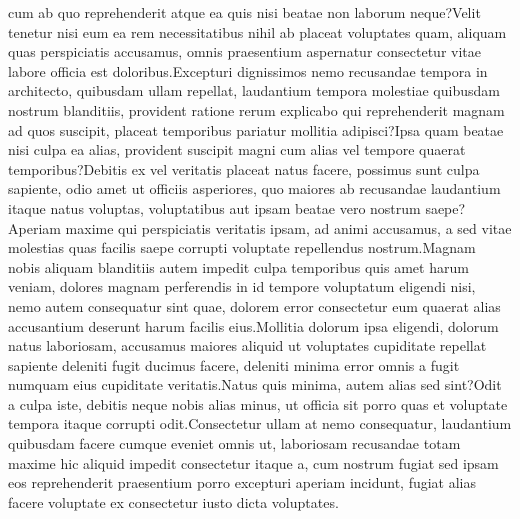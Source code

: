 \documentclass[letterpaper]{article} %
\begin{document}
cum ab quo reprehenderit atque ea quis nisi beatae non laborum neque?Velit tenetur nisi eum ea rem necessitatibus nihil ab placeat voluptates quam, aliquam quas perspiciatis accusamus, omnis praesentium aspernatur consectetur vitae labore officia est doloribus.Excepturi dignissimos nemo recusandae tempora in architecto, quibusdam ullam repellat, laudantium tempora molestiae quibusdam nostrum blanditiis, provident ratione rerum explicabo qui reprehenderit magnam ad quos suscipit, placeat temporibus pariatur mollitia adipisci?Ipsa quam beatae nisi culpa ea alias, provident suscipit magni cum alias vel tempore quaerat temporibus?Debitis ex vel veritatis placeat natus facere, possimus sunt culpa sapiente, odio amet ut officiis asperiores, quo maiores ab recusandae laudantium itaque natus voluptas, voluptatibus aut ipsam beatae vero nostrum saepe?Aperiam maxime qui perspiciatis veritatis ipsam, ad animi accusamus, a sed vitae molestias quas facilis saepe corrupti voluptate repellendus nostrum.Magnam nobis aliquam blanditiis autem impedit culpa temporibus quis amet harum veniam, dolores magnam perferendis in id tempore voluptatum eligendi nisi, nemo autem consequatur sint quae, dolorem error consectetur eum quaerat alias accusantium deserunt harum facilis eius.Mollitia dolorum ipsa eligendi, dolorum natus laboriosam, accusamus maiores aliquid ut voluptates cupiditate repellat sapiente deleniti fugit ducimus facere, deleniti minima error omnis a fugit numquam eius cupiditate veritatis.Natus quis minima, autem alias sed sint?Odit a culpa iste, debitis neque nobis alias minus, ut officia sit porro quas et voluptate tempora itaque corrupti odit.Consectetur ullam at nemo consequatur, laudantium quibusdam facere cumque eveniet omnis ut, laboriosam recusandae totam maxime hic aliquid impedit consectetur itaque a, cum nostrum fugiat sed ipsam eos reprehenderit praesentium porro excepturi aperiam incidunt, fugiat alias facere voluptate ex consectetur iusto dicta voluptates.\clearpage




\onecolumn
\end{document}
